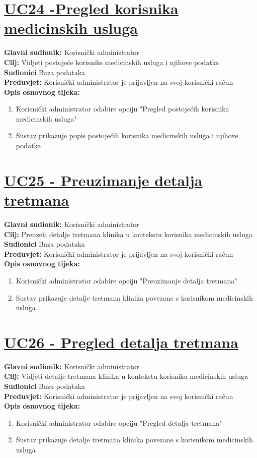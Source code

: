 \documentclass{article}
\begin{document}
	\section* {\underline{UC24 -Pregled korisnika medicinskih usluga}}
	\textbf{Glavni sudionik:} Korisnički administrator \\
	\textbf{Cilj:} Vidjeti postojeće korisnike medicinskih usluga i njihove podatke\\
	\textbf{Sudionici} Baza podataka \\
	\textbf{Preduvjet:} Korisnički administrator je prijavljen na svoj korisnički račun\\
	\textbf{Opis osnovnog tijeka:}
	\begin{enumerate}
		\item Korisnički administrator odabire opciju "Pregled postojećih korisnika medicinskih usluga"
		\item Sustav prikazuje popis postojećih korisnika medicinskih usluga i njihove podatke
	\end{enumerate}
	
	\section* {\underline{UC25 - Preuzimanje detalja tretmana}}
	\textbf{Glavni sudionik:} Korisnički administrator \\
	\textbf{Cilj:} Preuzeti detalje tretmana klinika u kontekstu korisnika medicinskih usluga\\
	\textbf{Sudionici} Baza podataka \\
	\textbf{Preduvjet:} Korisnički administrator je prijavljen na svoj korisnički račun\\
	\textbf{Opis osnovnog tijeka:}
	\begin{enumerate}
		\item Korisnički administrator odabire opciju "Preuzimanje detalja tretmana"
		\item Sustav prikazuje detalje tretmana klinika povezane s korisnikom medicinskih usluga
	\end{enumerate}
	
	\section* {\underline{UC26 - Pregled detalja tretmana}}
	\textbf{Glavni sudionik:} Korisnički administrator \\
	\textbf{Cilj:} Vidjeti detalje tretmana klinika u kontekstu korisnika medicinskih usluga\\
	\textbf{Sudionici} Baza podataka \\
	\textbf{Preduvjet:} Korisnički administrator je prijavljen na svoj korisnički račun\\
	\textbf{Opis osnovnog tijeka:}
	\begin{enumerate}
		\item Korisnički administrator odabire opciju "Pregled detalja tretmana"
		\item Sustav prikazuje detalje tretmana klinika povezane s korisnikom medicinskih usluga
	\end{enumerate}
\end{document}
